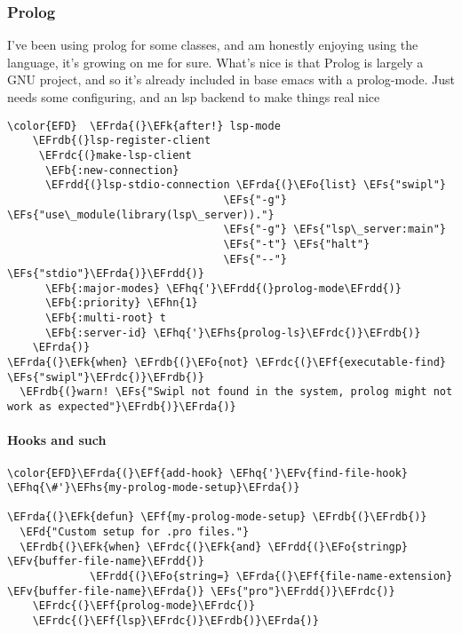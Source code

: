 \documentclass{article}
\newcommand{\EFs}[1]{\textcolor{EFs}{#1}} %
\newcommand{\EFd}[1]{\textcolor{EFd}{#1}} %
\newcommand{\EFk}[1]{\textcolor{EFk}{#1}} %
\newcommand{\EFb}[1]{\textcolor{EFb}{#1}} %
\newcommand{\EFf}[1]{\textcolor{EFf}{#1}} %
\newcommand{\EFv}[1]{\textcolor{EFv}{#1}} %
\newcommand{\EFo}[1]{\textcolor{EFo}{#1}} %
\newcommand{\EFhn}[1]{\textcolor{EFhn}{\textbf{#1}}} %
\newcommand{\EFhq}[1]{#1} %
\newcommand{\EFhs}[1]{\textcolor{EFhs}{#1}} %
\newcommand{\EFrda}[1]{\textcolor{EFrda}{#1}} %
\newcommand{\EFrdb}[1]{\textcolor{EFrdb}{#1}} %
\newcommand{\EFrdc}[1]{\textcolor{EFrdc}{#1}} %
\newcommand{\EFrdd}[1]{\textcolor{EFrdd}{#1}} %
\begin{document}
\subsubsection{Prolog}
\label{sec:org23a4cb3}
I've been using prolog for some classes, and am honestly enjoying using the language, it's growing on me for sure. What's nice is that Prolog is largely a GNU project, and so it's already included in base emacs with a prolog-mode. Just needs some configuring, and an lsp backend to make things real nice
\begin{Code}
\begin{Verbatim}
\color{EFD}  \EFrda{(}\EFk{after!} lsp-mode
    \EFrdb{(}lsp-register-client
     \EFrdc{(}make-lsp-client
      \EFb{:new-connection}
      \EFrdd{(}lsp-stdio-connection \EFrda{(}\EFo{list} \EFs{"swipl"}
                                  \EFs{"-g"} \EFs{"use\_module(library(lsp\_server))."}
                                  \EFs{"-g"} \EFs{"lsp\_server:main"}
                                  \EFs{"-t"} \EFs{"halt"}
                                  \EFs{"--"} \EFs{"stdio"}\EFrda{)}\EFrdd{)}
      \EFb{:major-modes} \EFhq{'}\EFrdd{(}prolog-mode\EFrdd{)}
      \EFb{:priority} \EFhn{1}
      \EFb{:multi-root} t
      \EFb{:server-id} \EFhq{'}\EFhs{prolog-ls}\EFrdc{)}\EFrdb{)}
    \EFrda{)}
\EFrda{(}\EFk{when} \EFrdb{(}\EFo{not} \EFrdc{(}\EFf{executable-find} \EFs{"swipl"}\EFrdc{)}\EFrdb{)}
  \EFrdb{(}warn! \EFs{"Swipl not found in the system, prolog might not work as expected"}\EFrdb{)}\EFrda{)}
\end{Verbatim}
\end{Code}

\paragraph{Hooks and such}
\label{sec:org4f1dec4}
\begin{Code}
\begin{Verbatim}
\color{EFD}\EFrda{(}\EFf{add-hook} \EFhq{'}\EFv{find-file-hook} \EFhq{\#'}\EFhs{my-prolog-mode-setup}\EFrda{)}

\EFrda{(}\EFk{defun} \EFf{my-prolog-mode-setup} \EFrdb{(}\EFrdb{)}
  \EFd{"Custom setup for .pro files."}
  \EFrdb{(}\EFk{when} \EFrdc{(}\EFk{and} \EFrdd{(}\EFo{stringp} \EFv{buffer-file-name}\EFrdd{)}
             \EFrdd{(}\EFo{string=} \EFrda{(}\EFf{file-name-extension} \EFv{buffer-file-name}\EFrda{)} \EFs{"pro"}\EFrdd{)}\EFrdc{)}
    \EFrdc{(}\EFf{prolog-mode}\EFrdc{)}
    \EFrdc{(}\EFf{lsp}\EFrdc{)}\EFrdb{)}\EFrda{)}
\end{Verbatim}
\end{Code}
\end{document}
